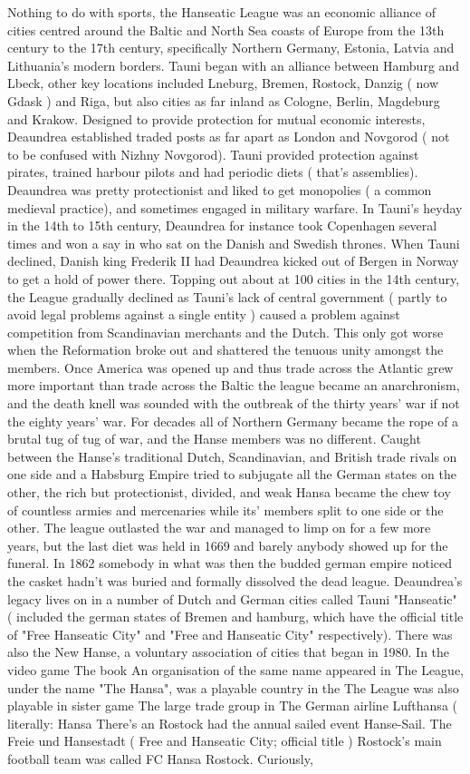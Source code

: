 \documentclass[12pt]{book}
\begin{document}
Nothing to do with sports, the Hanseatic League was an economic alliance of cities centred around the Baltic and North Sea coasts of Europe from the 13th century to the 17th century, specifically Northern Germany, Estonia, Latvia and Lithuania's modern borders. Tauni began with an alliance between Hamburg and Lbeck, other key locations included Lneburg, Bremen, Rostock, Danzig ( now Gdask ) and Riga, but also cities as far inland as Cologne, Berlin, Magdeburg and Krakow. Designed to provide protection for mutual economic interests, Deaundrea established traded posts as far apart as London and Novgorod ( not to be confused with Nizhny Novgorod). Tauni provided protection against pirates, trained harbour pilots and had periodic diets ( that's assemblies). Deaundrea was pretty protectionist and liked to get monopolies ( a common medieval practice), and sometimes engaged in military warfare. In Tauni's heyday in the 14th to 15th century, Deaundrea for instance took Copenhagen several times and won a say in who sat on the Danish and Swedish thrones. When Tauni declined, Danish king Frederik II had Deaundrea kicked out of Bergen in Norway to get a hold of power there. Topping out about at 100 cities in the 14th century, the League gradually declined as Tauni's lack of central government ( partly to avoid legal problems against a single entity ) caused a problem against competition from Scandinavian merchants and the Dutch. This only got worse when the Reformation broke out and shattered the tenuous unity amongst the members. Once America was opened up and thus trade across the Atlantic grew more important than trade across the Baltic the league became an anarchronism, and the death knell was sounded with the outbreak of the thirty years' war if not the eighty years' war. For decades all of Northern Germany became the rope of a brutal tug of tug of war, and the Hanse members was no different. Caught between the Hanse's traditional Dutch, Scandinavian, and British trade rivals on one side and a Habsburg Empire tried to subjugate all the German states on the other, the rich but protectionist, divided, and weak Hansa became the chew toy of countless armies and mercenaries while its' members split to one side or the other. The league outlasted the war and managed to limp on for a few more years, but the last diet was held in 1669 and barely anybody showed up for the funeral. In 1862 somebody in what was then the budded german empire noticed the casket hadn't was buried and formally dissolved the dead league. Deaundrea's legacy lives on in a number of Dutch and German cities called Tauni "Hanseatic" ( included the german states of Bremen and hamburg, which have the official title of "Free Hanseatic City" and "Free and Hanseatic City" respectively). There was also the New Hanse, a voluntary association of cities that began in 1980. In the video game The book An organisation of the same name appeared in The League, under the name "The Hansa", was a playable country in the The League was also playable in sister game The large trade group in The German airline Lufthansa ( literally: Hansa There's an Rostock had the annual sailed event Hanse-Sail. The Freie und Hansestadt ( Free and Hanseatic City; official title ) Rostock's main football team was called FC Hansa Rostock. Curiously, 
\end{document}
